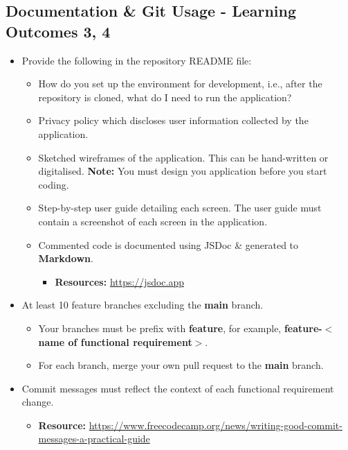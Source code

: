 \documentclass{article}
\begin{document}
\subsection*{Documentation \& Git Usage - Learning Outcomes 3, 4}
\begin{itemize}
    \item Provide the following in the repository README file:
    \begin{itemize}
        \item How do you set up the environment for development, i.e., after the repository is cloned, what do I need to run the application?
        \item Privacy policy which discloses user information collected by the application.
        \item Sketched wireframes of the application. This can be hand-written or digitalised. \textbf{Note:} You must design you application before you start coding.
        \item Step-by-step user guide detailing each screen. The user guide must contain a screenshot of each screen in the application.
        \item Commented code is documented using JSDoc \& generated to \textbf{Markdown}.
        \begin{itemize}
            \item \textbf{Resources:} \footnotesize\href{https://jsdoc.app}{https://jsdoc.app}
        \end{itemize} 
    \end{itemize}
    \item At least 10 feature branches excluding the \textbf{main} branch.
    \begin{itemize}
        \item Your branches must be prefix with \textbf{feature}, for example, \textbf{feature-$<$name of functional requirement$>$}.
        \item For each branch, merge your own pull request to the \textbf{main} branch. 
    \end{itemize}
    \item Commit messages must reflect the context of each functional requirement change.
    \begin{itemize}
		\item \textbf{Resource:} \footnotesize\href{https://www.freecodecamp.org/news/writing-good-commit-messages-a-practical-guide}{https://www.freecodecamp.org/news/writing-good-commit-messages-a-practical-guide}
	\end{itemize}
\end{itemize}
\end{document}

